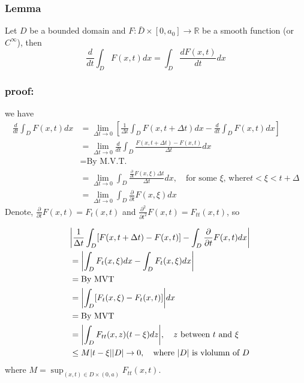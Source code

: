 \subsubsection{Lemma} %

Let $D$ be a bounded domain and $F: \bar{D}\times[0,a_0]\to \mathbb{R}$ be a smooth function (or $C^{\infty}$), then 
\begin{equation}
\frac{d}{dt}\int_{D} F(x,t) dx = \int_D \frac{dF(x,t)}{dt}dx
\end{equation}


\subsubsection{proof:} %

we have
\begin{equation}
\begin{aligned}
\frac{d}{dt} \int_D F(x,t) dx
&= \lim_{\Delta t\to 0}\left[
\frac{1}{\Delta t} \int_D F(x,t+\Delta t) dx
- \frac{d}{dt} \int_D F(x,t) dx
\right]\\
&= \lim_{\Delta t\to 0} \frac{d}{dt} \int_D \frac{F(x,t+\Delta t) - F(x,t)}{\Delta t} dx\\
&= \text{By M.V.T.}\\
&= \lim_{\Delta t\to 0} \int_D \frac{\frac{\partial}{\partial t} F(x,\xi) \Delta t}{\Delta t} dx,\quad \text{for some $\xi$, where} t<\xi<t+\Delta\\
&= \lim_{\Delta t\to 0}\int_{D} \frac{\partial}{\partial t}F(x,\xi) dx
\end{aligned}
\end{equation}
Denote, $\displaystyle \frac{\partial}{\partial t}F(x,t) = F_t(x,t)$ and $\displaystyle \frac{\partial^2}{\partial t^2}F(x,t) = F_{tt}(x,t)$, so


\begin{equation}
\begin{aligned}
\quad&
\abs{\frac{1}{\Delta t}\int_D [F(x,t+\Delta t) - F(x,t)] - \int_D \frac{\partial}{\partial t}F(x,t)dx} \\
&= \abs{\int_{D}F_t(x,\xi) dx - \int_{D}F_t(x,\xi)dx}\\
&= \text{By MVT}\\
&= \abs{\int_{D}[F_t(x,\xi) - F_t(x,t)]}dx\\
&= \text{By MVT}\\
&= \abs{\int_{D} F_{tt}(x,z)(t-\xi)dz} ,\quad\text{$z$ between $t$ and $\xi$}\\
&\leq M\abs{t-\xi}\abs{D}\to 0,\quad \text{where $\abs{D}$ is vlolumn of $D$}
\end{aligned}
\end{equation}
where $\displaystyle M=\sup_{(x,t)\in D\times (0,a)} F_{tt}(x,t)$.

